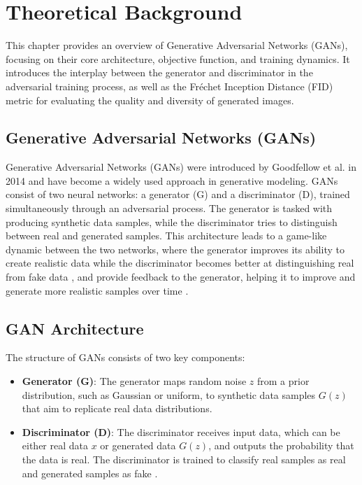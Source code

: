 \chapter{Theoretical Background}
\label{Theoretical Background for GAN}
This chapter provides an overview of Generative Adversarial Networks (GANs), focusing on their core architecture, objective function, and training dynamics. It introduces the interplay between the generator and discriminator in the adversarial training process, as well as the Fréchet Inception Distance (FID) metric for evaluating the quality and diversity of generated images.



\section{Generative Adversarial Networks (GANs)}

Generative Adversarial Networks (GANs) were introduced by Goodfellow et al. in 2014 and have become a widely used approach in generative modeling. GANs consist of two neural networks: a generator (G) and a discriminator (D), trained simultaneously through an adversarial process. The generator is tasked with producing synthetic data samples, while the discriminator tries to distinguish between real and generated samples. This architecture leads to a game-like dynamic between the two networks, where the generator improves its ability to create realistic data while the discriminator becomes better at distinguishing real from fake data \citep{10.1109/taslp.2017.2761547}, \citep{10.1007/s10928-021-09787-4} and provide feedback to the generator, helping it to improve and generate more realistic samples over time \citep{10.48550/arxiv.1802.05637}.

\section{GAN Architecture}

The structure of GANs consists of two key components:
\begin{itemize}
    \item \textbf{Generator (G)}: The generator maps random noise \(z\) from a prior distribution, such as Gaussian or uniform, to synthetic data samples \(G(z)\) that aim to replicate real data distributions.
    \item \textbf{Discriminator (D)}: The discriminator receives input data, which can be either real data \(x\) or generated data \(G(z)\), and outputs the probability that the data is real. The discriminator is trained to classify real samples as real and generated samples as fake \citep{10.48550/arxiv.1802.05637}.
\end{itemize}

